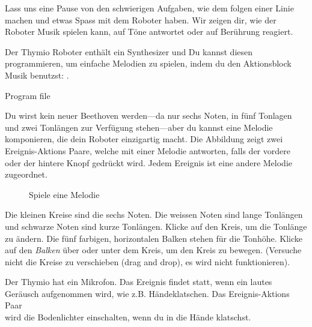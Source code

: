 \label{ch.bells}

Lass uns eine Pause von den schwierigen Aufgaben,
wie dem folgen einer Linie machen
und etwas Spass mit dem Roboter haben.
Wir zeigen dir, wie der Roboter Musik spielen kann, auf Töne antwortet oder auf Berührung reagiert.


Der Thymio Roboter enthält ein Synthesizer
und Du kannst diesen programmieren,
um einfache Melodien zu spielen,
indem du den Aktionsblock Musik benutzst: .

{\raggedleft \hfill Program file }

Du wirst kein neuer Beethoven werden---da nur sechs Noten,
in fünf Tonlagen und zwei Tonlängen
zur Verfügung stehen---aber du kannst eine Melodie komponieren,
die dein Roboter einzigartig macht. 
Die Abbildung  zeigt zwei Ereignis-Aktions Paare,
welche mit einer Melodie antworten,
falls der vordere oder der hintere Knopf gedrückt wird.
Jedem Ereignis ist eine andere Melodie zugeordnet.

\begin{figure}
\begin{center}
\caption{Spiele eine Melodie}
\label{fig.music}
\end{center}
\end{figure}

Die kleinen Kreise sind die sechs Noten.
Die weissen Noten sind lange Tonlängen
und schwarze Noten sind kurze Tonlängen.
Klicke auf den Kreis, um die Tonlänge zu ändern.
Die fünf farbigen, horizontalen Balken stehen für die Tonhöhe.
Klicke auf den \emph{Balken} über oder unter dem Kreis, um den Kreis zu bewegen. 
(Versuche nicht die Kreise zu verschieben (drag and drop), es wird nicht funktionieren). 



Der Thymio hat ein Mikrofon.
Das Ereignis  findet statt,
wenn ein lautes Geräusch aufgenommen wird, wie z.B. Händeklatschen.
Das Ereignis-Aktions Paar \\  wird die Bodenlichter einschalten,
wenn du in die Hände klatschst.

